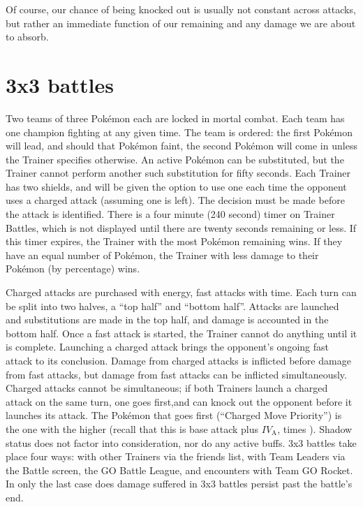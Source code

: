 Of course, our chance of being knocked out is usually not constant across
 attacks, but rather an immediate function of our remaining \HP{} and any
 damage we are about to absorb.

\section{3x3 battles\label{sec:3x3}}
Two teams of three Pokémon each are locked in mortal combat.
Each team has one champion fighting at any given time.
The team is ordered: the first Pokémon will lead, and should that Pokémon
  faint, the second Pokémon will come in unless the Trainer specifies otherwise.
An active Pokémon can be substituted, but the Trainer cannot perform another
  such substitution for fifty seconds.
Each Trainer has two shields, and will be given the option to use one each time
  the opponent uses a charged attack (assuming one is left).
The decision must be made before the attack is identified.
There is a four minute (240 second) timer on Trainer Battles, which is not displayed
  until there are twenty seconds remaining or less.
If this timer expires, the Trainer with the most Pokémon remaining wins.
If they have an equal number of Pokémon, the Trainer with less damage to their
  Pokémon (by percentage) wins.

Charged attacks are purchased with energy, fast attacks with time.
Each turn can be split into two halves, a ``top half'' and ``bottom half''.
Attacks are launched and substitutions are made in the top half, and damage is accounted in the bottom half.
Once a fast attack is started, the Trainer cannot do anything until it is complete.
Launching a charged attack brings the opponent's ongoing fast attack to its conclusion.
Damage from charged attacks is inflicted before damage from fast attacks,
  but damage from fast attacks can be inflicted simultaneously.
Charged attacks cannot be simultaneous; if both Trainers launch a charged attack
  on the same turn, one goes first,and can knock out the opponent before it
  launches its attack.
The Pokémon that goes first (``Charged Move Priority'') is the one with the
  higher  (recall that this is base attack plus $\mathit{IV}_\mathrm{A}$, times \CPM).
Shadow status does not factor into consideration, nor do any active buffs.
3x3 battles take place four ways: with other Trainers via the friends list,
 with Team Leaders via the Battle screen, the GO Battle League,
 and encounters with Team GO Rocket.
In only the last case does damage suffered in 3x3 battles persist past the battle's end.

